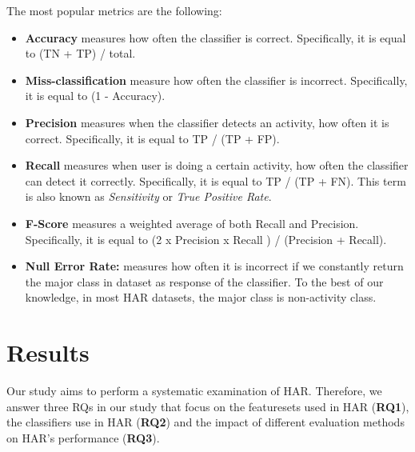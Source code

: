 \documentclass[journal,article,submit,moreauthors,pdftex]{Definitions/mdpi}
\begin{document}
The most popular metrics are the following:\\

\begin{itemize}

\item \noindent \textbf{Accuracy} measures how often the classifier is correct. Specifically, it is equal to (TN + TP) / total.\\

\item \noindent \textbf{Miss-classification} measure how often the classifier is incorrect. Specifically, it is equal to (1 - Accuracy).

\item \noindent \textbf{Precision} measures when the classifier detects an activity, how often it is  correct. Specifically, it is equal to TP / (TP + FP). \\

\item \noindent \textbf{Recall} measures when user is doing a certain activity, how often the classifier can detect it correctly. Specifically, it is equal to TP / (TP + FN). This term is also known as \textit{Sensitivity} or \textit{True Positive Rate}.\\

\item \noindent \textbf{F-Score} measures a weighted average of both Recall and Precision. Specifically, it is equal to (2 x Precision x Recall ) / (Precision + Recall). \\

\item \noindent \textbf{Null Error Rate:} measures how often it is incorrect if we constantly return the major class in dataset as response of the classifier. To the best of our knowledge, in most HAR datasets, the major class is non-activity class.\\

\end{itemize}




\section{Results}
Our study aims to perform a systematic examination of HAR. Therefore, we answer three RQs in our study that focus on the featuresets used in HAR (\textbf{RQ1}), the classifiers use in HAR (\textbf{RQ2}) and the impact of different evaluation methods on HAR's performance (\textbf{RQ3}).
\end{document}
